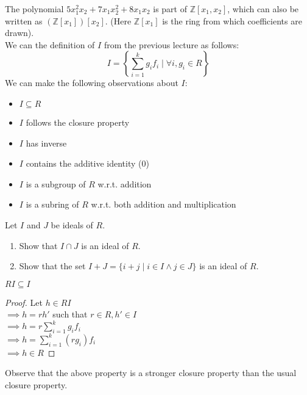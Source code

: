 The polynomial $5x_1^2x_2 + 7x_1x_2^2 + 8x_1x_2$ is part of $\mathbb{Z}[x_1,x_2]$, which can also be written as $(\mathbb{Z}[x_1])[x_2]$. (Here $\mathbb{Z}[x_1]$ is the ring from which coefficients are drawn).\\

We can the definition of $I$ from the previous lecture as follows:
\begin{equation}
I = \left\lbrace \sum\limits_{i=1}^{k} g_{i}f_{i}\mid \forall i, g_i \in R\right\rbrace
\end{equation}
We can make the following observations about $I$:
\begin{itemize}
\item $I \subseteq R$
\item $I$ follows the closure property
\item $I$ has inverse
\item $I$ contains the additive identity (0)
\item $I$ is a subgroup of $R$ w.r.t. addition
\item $I$ is a subring of $R$ w.r.t. both addition and multiplication\\
\end{itemize}

\begin{exercise}

Let $I$ and $J$ be ideals of $R$.
\begin{enumerate}
\item Show that $I \cap J$ is an ideal of $R$.
\item Show that the set $I+J = \{i+j \mid i \in I \land j \in J \}$ is an ideal of $R$.
\end{enumerate}
\end{exercise}


\begin{observation}
$RI \subseteq I$ 
\end{observation}
\begin{proof}
Let $h \in RI$\\
$\implies h=rh'$ such that $r \in R, h' \in I$\\
$\implies h=r\sum\limits_{i=1}^{k} g_{i}f_{i}$\\
$\implies h=\sum\limits_{i=1}^{k} (rg_{i})f_{i}$\\
$\implies h \in R$
\end{proof}

Observe that the above property is a stronger closure property than the usual closure property.


